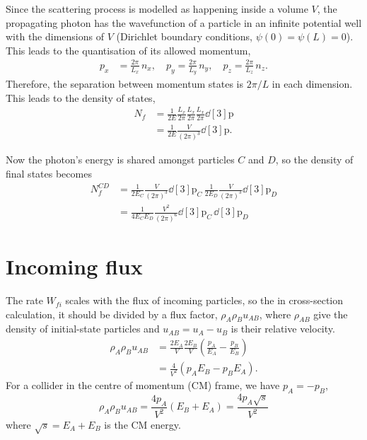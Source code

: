 \documentclass{report}
\renewcommand{\vec}[1]{\bm{\mathrm{#1}}}
\begin{document}
Since the scattering process is modelled as happening inside a volume $V$, the propagating photon has the wavefunction of a particle in an infinite potential well with the dimensions of $V$ (Dirichlet boundary conditions, $\psi(0) = \psi(L) = 0$). This leads to the quantisation of its allowed momentum,
\begin{align}
p_x &= \frac{2\pi}{L_x}\, n_x, \quad 
p_y = \frac{2\pi}{L_y}\, n_y, \quad
p_z = \frac{2\pi}{L_z}\, n_z.
\end{align}
Therefore, the separation between momentum states is $2\pi/L$ in each dimension. This leads to the density of states,
\begin{align}
N_f &= \frac{1}{2E} \frac{L_x}{2\pi} \frac{L_x}{2\pi} \frac{L_x}{2\pi} \dd[3]{\vec{p}} \nonumber \\
&= \frac{1}{2E} \frac{V}{(2\pi)^3} \dd[3]{\vec{p}}.
\end{align}

Now the photon's energy is shared amongst particles $C$ and $D$, so the density of final states becomes
\begin{align}
N_f^{CD} &= \frac{1}{2E_C} \frac{V}{(2\pi)^3} \dd[3]{\vec{p}_C} \, \frac{1}{2E_D} \frac{V}{(2\pi)^3} \dd[3]{\vec{p}_D} \\
&= \frac{1}{4E_CE_D}\frac{V^2}{(2\pi)^6} \dd[3]{\vec{p}_C} \, \dd[3]{\vec{p}_D}
\end{align}

\section{Incoming flux}
The rate $W_{fi}$ scales with the flux of incoming particles, so the in cross-section calculation, it should be divided by a flux factor, $\rho_A\rho_Bu_{AB}$, where $\rho_{AB}$ give the density of initial-state particles and $u_{AB} = u_A - u_B$ is their relative velocity.
\begin{align}
\rho_A\rho_Bu_{AB} &= \frac{2E_A}{V} \frac{2E_B}{V} \left( \frac{p_A}{E_A} - \frac{p_B}{E_B} \right) \\
&= \frac{4}{V^2} \left( p_A E_B - p_B E_A \right).
\end{align}
For a collider in the centre of momentum (CM) frame, we have $p_A = -p_B$,
\begin{equation}
\rho_A\rho_Bu_{AB} = \frac{4p_A}{V^2} (E_B + E_A) = \frac{4p_A\sqrt{s}}{V^2}
\end{equation}
where $\sqrt{s} = E_A + E_B$ is the CM energy.
\end{document}
